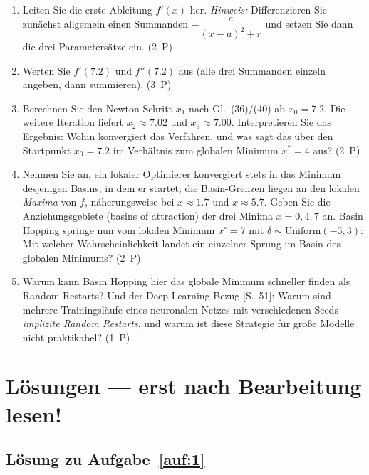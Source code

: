 \documentclass[a4paper,11pt]{scrartcl}
\begin{document}
\begin{enumerate}[label=(\alph*)]
  \item Leiten Sie die erste Ableitung $f'(x)$ her. \emph{Hinweis:} Differenzieren Sie
        zunächst allgemein einen Summanden $-\dfrac{c}{(x-a)^2 + r}$ und setzen Sie dann
        die drei Parametersätze ein. \hfill (2~P)
  \item Werten Sie $f'(7.2)$ und $f''(7.2)$ aus (alle drei Summanden einzeln angeben,
        dann summieren). \hfill (3~P)
  \item Berechnen Sie den Newton-Schritt $x_1$ nach Gl.~(36)/(40) ab $x_0 = 7.2$. Die
        weitere Iteration liefert $x_2 \approx 7.02$ und $x_3 \approx 7.00$.
        Interpretieren Sie das Ergebnis: Wohin konvergiert das Verfahren, und was sagt
        das über den Startpunkt $x_0 = 7.2$ im Verhältnis zum globalen Minimum
        $x^* = 4$ aus? \hfill (2~P)
  \item Nehmen Sie an, ein lokaler Optimierer konvergiert stets in das Minimum
        desjenigen Basins, in dem er startet; die Basin-Grenzen liegen an den lokalen
        \emph{Maxima} von $f$, näherungsweise bei
        $x \approx 1.7$ und $x \approx 5.7$. Geben Sie die Anziehungsgebiete (basins of
        attraction) der drei Minima $x = 0, 4, 7$ an. Basin Hopping springe nun vom
        lokalen Minimum $x^\circ = 7$ mit $\delta \sim \mathrm{Uniform}(-3, 3)$:
        Mit welcher Wahrscheinlichkeit landet ein einzelner Sprung im Basin des
        globalen Minimums? \hfill (2~P)
  \item Warum kann Basin Hopping hier das globale Minimum schneller finden als Random
        Restarts? Und der Deep-Learning-Bezug [S.~51]: Warum sind mehrere
        Trainingsläufe eines neuronalen Netzes mit verschiedenen Seeds
        \emph{implizite Random Restarts}, und warum ist diese Strategie für große
        Modelle nicht praktikabel? \hfill (1~P)
\end{enumerate}

\schreibraum[13]
\newpage

\section*{Lösungen --- erst nach Bearbeitung lesen!}

\subsection*{Lösung zu Aufgabe~\ref{auf:1}}
\end{document}

